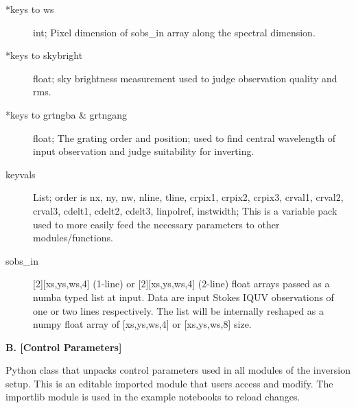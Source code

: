 \documentclass{article}
\begin{document}
\begin{description}
    \item[*keys to ws]
         int; Pixel dimension of sobs\_in array along the spectral dimension.               
    \item[*keys to skybright]
    		float; sky brightness measurement used to judge observation quality and rms.
    \item[*keys to grtngba \& grtngang] 
    		float; The grating order and position; used to find central wavelength of input observation and judge suitability for inverting.   
    	\item[keyvals]
    		List; order is nx, ny, nw, nline, tline, crpix1, crpix2, crpix3, crval1, crval2, crval3, cdelt1, cdelt2, cdelt3, linpolref, instwidth;  This is a variable pack used to more easily feed the necessary parameters to other modules/functions.                        
    \item[sobs\_in]
         [2][xs,ys,ws,4] (1-line) or [2][xs,ys,ws,4] (2-line) float arrays passed as a numba typed list at input. Data are input Stokes IQUV observations of one or two lines respectively. The list will be internally reshaped as a numpy float array of [xs,ys,ws,4] or [xs,ys,ws,8] size.  
\end{description}

\textbf{B. [Control Parameters]}

Python class that unpacks control parameters used in all modules of the inversion setup. This is an editable imported module that users access and modify. The importlib module is used in the example notebooks to reload changes.
\end{document}
